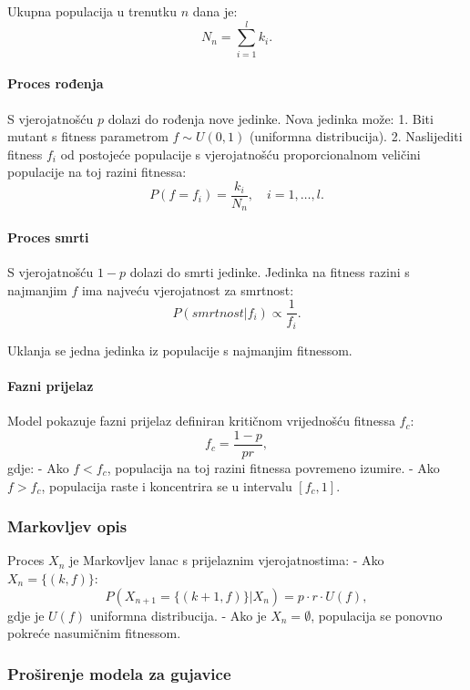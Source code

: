 \documentclass[
]{article}
\begin{document}
Ukupna populacija u trenutku \(n\) dana je: \[
N_n = \sum_{i=1}^l k_i.
\]

\paragraph{Proces rođenja}\label{proces-roux111enja}

S vjerojatnošću \(p\) dolazi do rođenja nove jedinke. Nova jedinka može:
1. Biti mutant s fitness parametrom \(f \sim U(0,1)\) (uniformna
distribucija). 2. Naslijediti fitness \(f_i\) od postojeće populacije s
vjerojatnošću proporcionalnom veličini populacije na toj razini
fitnessa: \[
P(f = f_i) = \frac{k_i}{N_n}, \quad i = 1, \dots, l.
\]

\paragraph{Proces smrti}\label{proces-smrti}

S vjerojatnošću \(1-p\) dolazi do smrti jedinke. Jedinka na fitness
razini s najmanjim \(f\) ima najveću vjerojatnost za smrtnost: \[
P(smrtnost|f_i) \propto \frac{1}{f_i}.
\]

Uklanja se jedna jedinka iz populacije s najmanjim fitnessom.

\paragraph{Fazni prijelaz}\label{fazni-prijelaz}

Model pokazuje fazni prijelaz definiran kritičnom vrijednošću fitnessa
\(f_c\): \[
f_c = \frac{1-p}{pr},
\] gdje: - Ako \(f < f_c\), populacija na toj razini fitnessa povremeno
izumire. - Ako \(f > f_c\), populacija raste i koncentrira se u
intervalu \([f_c, 1]\).

\subsubsection{Markovljev opis}\label{markovljev-opis}

Proces \(X_n\) je Markovljev lanac s prijelaznim vjerojatnostima: - Ako
\(X_n = \{(k, f)\}\): \[
  P(X_{n+1} = \{(k+1, f)\} | X_n) = p \cdot r \cdot U(f),
  \] gdje je \(U(f)\) uniformna distribucija. - Ako je
\(X_n = \emptyset\), populacija se ponovno pokreće nasumičnim fitnessom.

\subsubsection{Proširenje modela za
gujavice}\label{proux161irenje-modela-za-gujavice}
\end{document}
